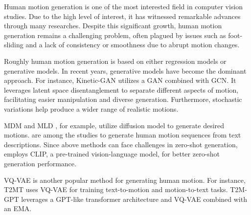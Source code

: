 Human motion generation is one of the most interested field in computer vision studies. Due to the high level of interest, it has witnessed remarkable advances through many researches. Despite this significant growth, human motion generation remains a challenging problem, often plagued by issues such as foot-sliding and a lack of consistency or smoothness due to abrupt motion changes.

Roughly human motion generation is based on either regression models or generative models. In recent years, generative models have become the dominant approach. For instance, Kinetic-GAN \cite{degardin2022generative} utilizes a GAN combined with GCN. It leverages latent space disentanglement to separate different aspects of motion, facilitating easier manipulation and diverse generation. Furthermore, stochastic variations help produce a wider range of realistic motions.

MDM \cite{tevet2022human} and MLD \cite{chen2023executing}, for example, utilize diffusion model to generate desired motions. \cite{ahn2018text2action, ahuja2019language2pose, ghosh2021synthesis, petrovich2022temos, athanasiou2022teach} are among the studies to generate human motion sequences from text descriptions. Since above methods can face challenges in zero-shot generation, \cite{tevet2022motionclip, hong2022avatarclip} employs CLIP, a pre-trained vision-language model, for better zero-shot generation performance.

VQ-VAE is another popular method for generating human motion. For instance, T2MT \cite{guo2022tm2t} uses VQ-VAE for training text-to-motion and motion-to-text tasks. T2M-GPT \cite{zhang2023t2m} leverages a GPT-like transformer architecture and VQ-VAE combined with an EMA. %

